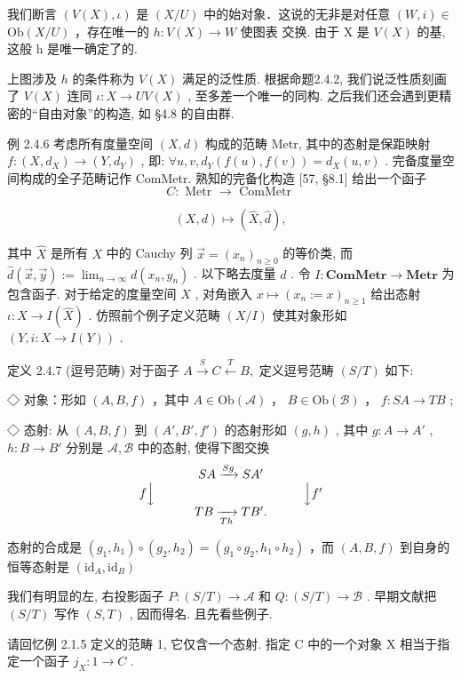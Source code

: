 \documentclass[]{article}
\begin{document}
我们断言 $(V(X),\iota)$ 是 $(X / U)$ 中的始对象．这说的无非是对任意 $(W,i)\in$ $\mathrm{Ob}(X / U)$ ，存在唯一的 $h:V(X)\to W$ 使图表  交换. 由于 X 是 $V(X)$ 的基, 这般 h 是唯一确定了的. 

上图涉及 $h$ 的条件称为 $V(X)$ 满足的泛性质. 根据命题2.4.2, 我们说泛性质刻画了 $V(X)$ 连同 $\iota: X \to UV(X)$ , 至多差一个唯一的同构. 之后我们还会遇到更精密的“自由对象”的构造, 如 §4.8 的自由群. 

例 2.4.6 考虑所有度量空间 $(X,d)$ 构成的范畴 Metr, 其中的态射是保距映射 $f: (X,d_{X}) \to (Y,d_{Y})$ , 即: $\forall u,v, d_{Y}(f(u),f(v)) = d_{X}(u,v)$ . 完备度量空间构成的全子范畴记作 ComMetr. 熟知的完备化构造 [57, §8.1] 给出一个函子 $$
C: \text {   Metr   } \longrightarrow \text {   ComMetr   }
$$

$$
(X, d) \longmapsto (\hat {X}, \hat {d}),
$$

其中 $\hat{X}$ 是所有 $X$ 中的 Cauchy 列 $\vec{x} = (x_n)_{n\geq 0}$ 的等价类, 而 $\hat{d} (\vec{x},\vec{y}):= \lim_{n\to \infty}d(x_n,y_n)$ . 以下略去度量 $d$ . 令 $I:\mathbf{ComMetr}\rightarrow \mathbf{Metr}$ 为包含函子. 对于给定的度量空间 $X$ , 对角嵌入 $x\mapsto (x_n:= x)_{n\geq 1}$ 给出态射 $\iota :X\to I(\hat{X})$ . 仿照前个例子定义范畴 $(X / I)$ 使其对象形如 $(Y,i:X\to I(Y))$ . 

定义 2.4.7 (逗号范畴) 对于函子 $A \xrightarrow{S} C \xleftarrow{T} B,$ 定义逗号范畴 $(S/T)$ 如下: 

◇ 对象：形如 $(A, B, f)$ ，其中 $A \in \mathrm{Ob}(\mathcal{A})$ ， $B \in \mathrm{Ob}(\mathcal{B})$ ， $f : SA \to TB$ ; 

◇ 态射: 从 $(A, B, f)$ 到 $(A', B', f')$ 的态射形如 $(g, h)$ , 其中 $g: A \to A'$ , $h: B \to B'$ 分别是 $\mathcal{A}, \mathcal{B}$ 中的态射, 使得下图交换 $$
\begin{array}{c} S A \xrightarrow {S g} S A ^ {\prime} \\ f \Big \downarrow \qquad \qquad \qquad \qquad \qquad \qquad \Big \downarrow f ^ {\prime} \\ T B \xrightarrow [ T h ]{} T B ^ {\prime}. \end{array}
$$

态射的合成是 $(g_{1},h_{1})\circ (g_{2},h_{2}) = (g_{1}\circ g_{2},h_{1}\circ h_{2})$ ，而 $(A,B,f)$ 到自身的恒等态射是 $(\mathrm{id}_A,\mathrm{id}_B)$ 

我们有明显的左, 右投影函子 $P: (S/T) \to \mathcal{A}$ 和 $Q: (S/T) \to \mathcal{B}$ . 早期文献把 $(S/T)$ 写作 $(S,T)$ , 因而得名. 且先看些例子. 

请回忆例 2.1.5 定义的范畴 1, 它仅含一个态射. 指定 C 中的一个对象 X 相当于指定一个函子 $j_{X}:1 \rightarrow C$ . 
\end{document}

